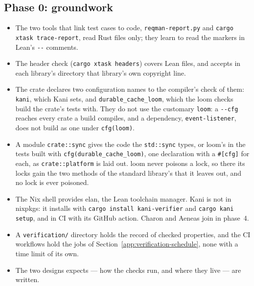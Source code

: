 \subsection*{Phase 0: groundwork}
\begin{itemize}
  \item The two tools that link test cases to code,
    \texttt{reqman-report.py} and \texttt{cargo xtask trace-report}, read
    Rust files only; they learn to read the markers in Lean's
    \texttt{-{}-} comments.
  \item The header check (\texttt{cargo xtask headers}) covers Lean files,
    and accepts in each library's directory that library's own copyright
    line.
  \item The crate declares two configuration names to the compiler's check
    of them: \texttt{kani}, which Kani sets, and
    \texttt{durable\_cache\_loom}, which the loom checks build the crate's
    tests with. They do not use the customary \texttt{loom}: a
    \texttt{-{}-cfg} reaches every crate a build compiles, and a dependency,
    \texttt{event-listener}, does not build as one under \texttt{cfg(loom)}.
  \item A module \texttt{crate::sync} gives the code the \texttt{std::sync}
    types, or loom's in the tests built with
    \texttt{cfg(durable\_cache\_loom)}, one declaration with a
    \texttt{\#[cfg]} for each, as \texttt{crate::platform} is laid out. loom
    never poisons a lock, so there its locks gain the two methods of the
    standard library's that it leaves out, and no lock is ever poisoned.
  \item The Nix shell provides elan, the Lean toolchain manager. Kani is not
    in nixpkgs: it installs with \texttt{cargo install kani-verifier} and
    \texttt{cargo kani setup}, and in CI with its GitHub action. Charon and
    Aeneas join in phase~4.
  \item A \texttt{verification/} directory holds the record of checked
    properties, and the CI workflows hold the jobs of
    Section~\ref{app:verification-schedule}, none with a time limit of its
    own.
  \item The two designs  expects --- how
    the checks run, and where they live --- are written.
\end{itemize}


